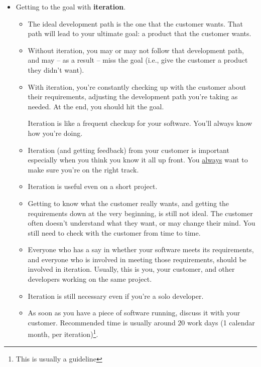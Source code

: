 \documentclass[letterpaper]{article}
\begin{document}
\begin{itemize}
    \item Getting to the goal with \textbf{iteration}.
    \begin{itemize}
        \item The ideal development path is the one that the customer wants. That path will lead to your ultimate goal: a product that the customer wants. 
        \item Without iteration, you may or may not follow that development path, and may -- as a result -- miss the goal (i.e., give the customer a product they didn't want).
        \item With iteration, you're constantly checking up with the customer about their requirements, adjusting the development path you're taking as needed. At the end, you should hit the goal. 
        \begin{mdframed}
            Iteration is like a frequent checkup for your software. You'll always know how you're doing. 
        \end{mdframed}
        \item Iteration (and getting feedback) from your customer is important especially when you think you know it all up front. You \underline{always} want to make sure you're on the right track. 
        \item Iteration is useful even on a short project. 
        \item Getting to know what the customer really wants, and getting the requirements down at the very beginning, is still not ideal. The customer often doesn't understand what they want, or may change their mind. You still need to check with the customer from time to time. 
        \item Everyone who has a say in whether your software meets its requirements, and everyone who is involved in meeting those requirements, should be involved in iteration. Usually, this is you, your customer, and other developers working on the same project. 
        \item Iteration is still necessary even if you're a solo developer. 
        \item As soon as you have a piece of software running, discuss it with your customer. Recommended time is usually around 20 work days (1 calendar month, per iteration)\footnote{This is usually a guideline}.
    \end{itemize}


\end{itemize}
\end{document}
